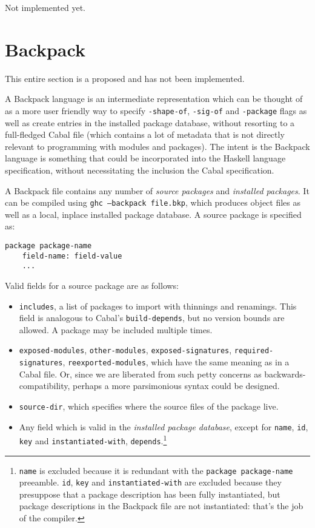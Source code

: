 \documentclass{article}
\newcommand{\Red}[1]{{\color{red} #1}}
\begin{document}
\Red{Not implemented yet.}

\section{Backpack}

\Red{This entire section is a proposed and has not been implemented.}

A Backpack language is an intermediate representation which can be
thought of as a more user friendly way to specify \texttt{-shape-of},
\texttt{-sig-of} and \texttt{-package} flags as well as create entries
in the installed package database, without resorting to a full-fledged
Cabal file (which contains a lot of metadata that is not directly
relevant to programming with modules and packages).  The intent is
the Backpack language is something that could be incorporated into
the Haskell language specification, without necessitating the inclusion
the Cabal specification.

A Backpack file contains any number of \emph{source packages} and
\emph{installed packages}.  It can be compiled using \texttt{ghc --backpack file.bkp},
which produces object files as well as a local, inplace installed package database.
A source package is specified as:

\begin{verbatim}
package package-name
    field-name: field-value
    ...
\end{verbatim}

Valid fields for a source package are as follows:

\begin{itemize}
    \item \texttt{includes}, a list of packages to import with thinnings and renamings.  This field is analogous to Cabal's \texttt{build-depends}, but no version bounds are allowed.  A package may be included multiple times.
    \item \texttt{exposed-modules}, \texttt{other-modules}, \texttt{exposed-signatures}, \texttt{required-signatures}, \texttt{reexported-modules}, which have the same meaning as in a Cabal file. \Red{Or, since we are liberated from such petty concerns as backwards-compatibility, perhaps a more parsimonious syntax could be designed.}
    \item \texttt{source-dir}, which specifies where the source files of the package live.
    \item Any field which is valid in the \emph{installed package database},
        except for \texttt{name}, \texttt{id}, \texttt{key} and \texttt{instantiated-with},
        \texttt{depends}.\footnote{\texttt{name} is excluded because it is redundant with the \texttt{package package-name} preeamble.  \texttt{id}, \texttt{key} and \texttt{instantiated-with} are excluded because they presuppose that a package description has been fully instantiated, but package descriptions in the Backpack file are not instantiated: that's the job of the compiler.}
\end{itemize}
\end{document}
